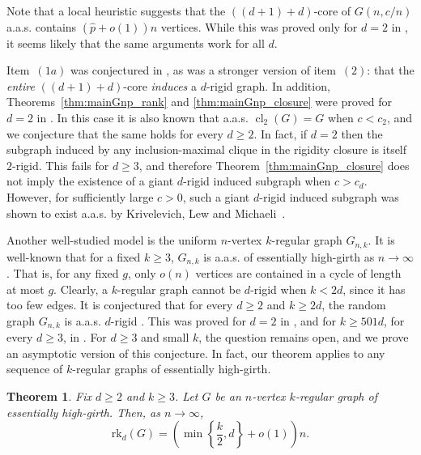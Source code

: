 \documentclass[reqno,english]{amsart}
\numberwithin{equation}{section}
\newtheorem{theorem}{Theorem}[section]
\theoremstyle{definition}{
\newtheorem{example}[theorem]{Example}
\newtheorem{definition}[theorem]{Definition}
\newtheorem*{definition*}{Definition}
\newtheorem{problem}[theorem]{Problem}
\newtheorem{question}[theorem]{Question}
}
\begin{document}
Note that a local heuristic suggests that the \(((d+1)+d)\)-core of
\(G(n,c/n)\) a.a.s. contains \((\hat p+o(1))n\) vertices. While this was
proved only for \(d=2\) in \cite{BarreLelargeMitscheSliders}, it seems
likely that the same arguments work for all $d$.

Item~\((1a)\) was conjectured in \cite{LewNevoPeledRazSharpThreshold}, as
was a stronger version of item~\((2)\): that the \emph{entire}
\(((d+1)+d)\)-core \emph{induces} a \(d\)-rigid graph.
In addition, Theorems~\ref{thm:mainGnp_rank} and
\ref{thm:mainGnp_closure} were proved for \(d=2\) in
\cite{KasiviswanathanMooreTheranRigidityTransition}. In this case it is also known that a.a.s.
\(\operatorname{cl}_2(G)=G\) when \(c<c_2\), and we conjecture that the
same holds for every \(d\ge 2\). In fact, if $d=2$ then the
subgraph induced by any inclusion-maximal clique in the rigidity closure is
itself \(2\)-rigid. This fails for \(d\ge 3\), and therefore
Theorem~\ref{thm:mainGnp_closure} does not imply the existence of a giant
\(d\)-rigid induced subgraph when \(c>c_d\). However, for sufficiently large
\(c>0\), such a giant \(d\)-rigid induced subgraph was shown to exist a.a.s.
by Krivelevich, Lew and Michaeli~\cite{KrivelevichCombinatorialSufficientConditions}.

\medskip

Another well-studied model is the uniform \(n\)-vertex \(k\)-regular graph
\(G_{n,k}\). It is well-known that for a fixed $k\ge 3$, $G_{n,k}$ is a.a.s. of essentially high-girth as $n\to\infty$. That is, for any fixed $g$, only $o(n)$ vertices are contained in a cycle of length at most $g$.
Clearly, a \(k\)-regular graph cannot be \(d\)-rigid when
\(k<2d\), since it has too few edges. It is conjectured that for every
\(d\ge 2\) and \(k\ge 2d\), the random graph \(G_{n,k}\) is a.a.s.
\(d\)-rigid \cite{KrivelevichLewMichaeliRigidPartitions}. This was proved for \(d=2\) in \cite{JSS-planeThreshold}, and for $k\ge 501d$, for every $d\ge 3$, in \cite{KrivelevichCombinatorialSufficientConditions}.
For \(d\ge 3\) and small $k$, the question remains open, and we prove an
asymptotic version of this conjecture. In fact, our theorem applies to any sequence of \(k\)-regular graphs of essentially high-girth.

\begin{theorem}\label{thm:main_high_girth_regular}
    Fix \(d\ge 2\) and \(k\ge 3\). Let \(G\) be an $n$-vertex 
    \(k\)-regular graph of essentially high-girth. Then, as $n\to\infty$,
    \[
        \mathrm{rk}_d(G)
        =
        \left(\min\left\{\frac{k}{2},d\right\}+o(1)\right)n .
    \]
\end{theorem}
\end{document}
